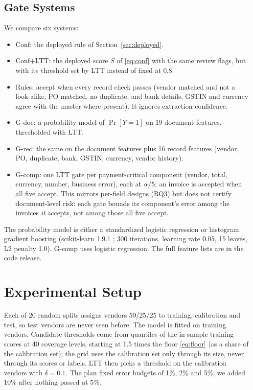 \documentclass[conference]{IEEEtran}
\newcommand{\sysB}{\textsf{Conf}}          %
\newcommand{\sysBl}{\textsf{Conf+LTT}}     %
\newcommand{\sysBtwo}{\textsf{Rules}}      %
\newcommand{\sysBone}{\textsf{G-doc}}      %
\newcommand{\sysP}{\textsf{G-rec}}         %
\newcommand{\sysFC}{\textsf{G-comp}}       %
\begin{document}
\subsection{Gate Systems}\label{sec:systems}
We compare six systems:
\begin{itemize}
\item \sysB: the deployed rule of Section~\ref{sec:deployed}.
\item \sysBl: the deployed score $S$ of \eqref{eq:conf} with the same review
flags, but with its threshold set by LTT instead of fixed at 0.8.
\item \sysBtwo: accept when every record check passes (vendor matched and not a
look-alike, PO matched, no duplicate, and bank details, GSTIN and currency agree
with the master where present). It ignores extraction confidence.
\item \sysBone: a probability model of $\Pr[Y=1]$ on 19 document features,
thresholded with LTT.
\item \sysP: the same on the document features plus 16 record features (vendor,
PO, duplicate, bank, GSTIN, currency, vendor history).
\item \sysFC: one LTT gate per payment-critical component (vendor, total,
currency, number, business error), each at $\alpha/5$; an invoice is accepted
when all five accept. This mirrors per-field designs (RQ3) but does not certify
document-level risk: each gate bounds its component's error among the invoices
\emph{it} accepts, not among those all five accept.
\end{itemize}
The probability model is either a standardized logistic regression or histogram
gradient boosting (scikit-learn 1.9.1 \cite{pedregosa2011}; 300
iterations, learning rate 0.05, 15 leaves, L2 penalty 1.0). \sysFC{} uses logistic regression. The full feature
lists are in the code release.

\section{Experimental Setup}\label{sec:setup}
Each of 20 random splits assigns vendors 50/25/25 to training, calibration and
test, so test vendors are never seen before. The model is fitted on training
vendors. Candidate thresholds come from quantiles of the in-sample training scores at 40 coverage levels, starting at 1.5 times the
floor \eqref{eq:floor} (as a share of the calibration set); the grid uses the calibration set only through its size, never through its
scores or labels. LTT then picks a threshold on the calibration vendors with
$\delta=0.1$. The plan fixed error budgets of 1\%, 2\% and 5\%; we added 10\%
after nothing passed at 5\%.
\end{document}
